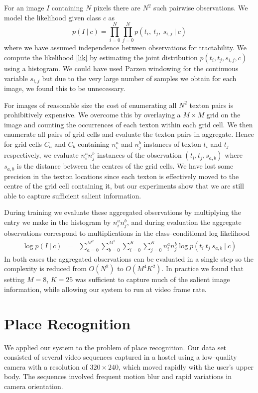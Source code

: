 For an image $I$ containing $N$ pixels there are $N^2$ such
pairwise observations. We model the likelihood given class $c$ as
\begin{equation}
p(I ~|~ c) = \prod_{i=0}^N \prod_{j=0}^N
p(t_i, ~ t_j, ~ s_{i,j} ~|~ c) \label{lik}
\end{equation}
where we have assumed independence between observations for
tractability. We compute the likelihood \eqref{lik} by estimating the
joint distribution $p(t_i,t_j,s_{i,j},c)$ using a histogram. We could
have used Parzen windowing \cite{Parzen62} for the continuous variable
$s_{i,j}$ but due to the very large number of samples we obtain for
each image, we found this to be unnecessary.

For images of reasonable size the cost of enumerating all $N^2$ texton
pairs is prohibitively expensive. We overcome this by overlaying a $M
\times M$ grid on the image and counting the occurrences of each
texton within each grid cell. We then enumerate all pairs of grid
cells and evaluate the texton pairs in aggregate. Hence for grid cells
$C_a$ and $C_b$ containing $n^a_i$ and $n^b_j$ instances of texton $t_i$
and $t_j$ respectively, we evaluate $n^a_i n^b_j$ instances of the
observation $(t_i,t_j,s_{a,b})$ where $s_{a,b}$ is the
distance between the centres of the grid cells. We have lost some
precision in the texton locations since each texton is effectively
moved to the centre of the grid cell containing it, but our
experiments show that we are still able to capture sufficient salient
information.

During training we evaluate these aggregated observations by
multiplying the entry we make in the histogram by $n^a_i n^b_j$, and
during evaluation the aggregate observations correspond to
multiplications in the class--conditional log likelihood
\begin{eqnarray}
\log p(I ~|~ c) & = & \sum_{a=0}^{M^2} \sum_{b=0}^{M^2} \sum_{i=0}^K  \sum_{j=0}^K
 n^a_in^b_j \log p(t_i ~ t_j ~ s_{a,b} ~|~ c)
\end{eqnarray}
In both cases the aggregated observations can be evaluated in a single
step so the complexity is reduced from $O(N^2)$ to $O(M^4 K^2)$. In
practice we found that setting $M$$=$$8$, $K$$=$$25$ was sufficient to capture
much of the salient image information, while allowing our system to run
at video frame rate.

\section{Place Recognition}
We applied our system to the problem of place recognition. Our data
set consisted of several video sequences captured in a hostel
using a low--quality camera with a resolution of $320 \times 240$,
which moved rapidly with the user's upper body. The sequences involved
frequent motion blur and rapid variations in camera orientation.

